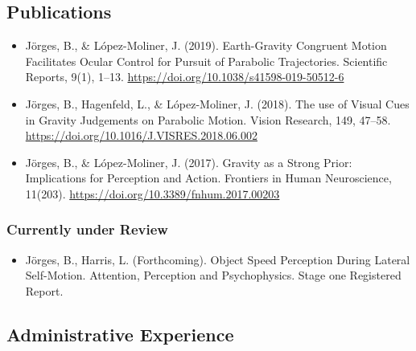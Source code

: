 \documentclass[]{article}
\providecommand{\tightlist}{%
  \setlength{\itemsep}{0pt}\setlength{\parskip}{0pt}}
\begin{document}
\hypertarget{publications}{%
\subsection{Publications}\label{publications}}

\begin{itemize}
\item
  Jörges, B., \& López-Moliner, J. (2019). Earth-Gravity Congruent
  Motion Facilitates Ocular Control for Pursuit of Parabolic
  Trajectories. Scientific Reports, 9(1), 1--13.
  \url{https://doi.org/10.1038/s41598-019-50512-6}
\item
  Jörges, B., Hagenfeld, L., \& López-Moliner, J. (2018). The use of
  Visual Cues in Gravity Judgements on Parabolic Motion. Vision
  Research, 149, 47--58.
  \url{https://doi.org/10.1016/J.VISRES.2018.06.002}
\item
  Jörges, B., \& López-Moliner, J. (2017). Gravity as a Strong Prior:
  Implications for Perception and Action. Frontiers in Human
  Neuroscience, 11(203). \url{https://doi.org/10.3389/fnhum.2017.00203}
\end{itemize}

\hypertarget{currently-under-review}{%
\subsubsection{Currently under Review}\label{currently-under-review}}

\begin{itemize}
\tightlist
\item
  Jörges, B., Harris, L. (Forthcoming). Object Speed Perception During
  Lateral Self-Motion. Attention, Perception and Psychophysics. Stage
  one Registered Report.
\end{itemize}

\hypertarget{administrative-experience}{%
\subsection{Administrative Experience}\label{administrative-experience}}
\end{document}
